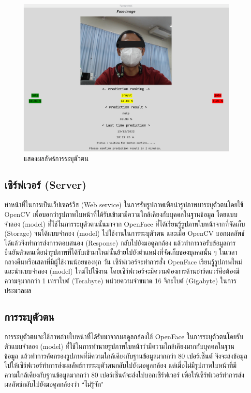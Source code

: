 \begin{figure}[!ht]
  \begin{center}
    \includegraphics[scale=.45]{pic/result_page_blind.png}
  \caption[แสดงผลลัพธ์การระบุตัวตน]{แสดงผลลัพธ์การระบุตัวตน}
  \end{center}
  \label{fig:predict_result}
\end{figure}


\subsection{เซิร์ฟเวอร์ (Server)}
ทำหน้าที่ในการเป็นเว็ปเซอร์วิส (Web service) ในการรับรูปภาพเพื่อนำรูปภาพมาระบุตัวตนโดยใช้ OpenCV
เพื่อบอกว่ารูปภาพใบหน้าที่ได้รับเข้ามามีความใกล้เคียงกับบุคคลในฐานข้อมูล โดยแบบจำลอง (model) ที่ใช้ในการระบุตัวตนนั้นมาจาก OpenFace ที่ได้เรียนรู้รูปภาพใบหน้าจากที่จัดเก็บ (Storage) 
จนได้แบบจำลอง (model) ไปใช้งานในการระบุตัวตน และเมื่อ OpenCV บอกผลลัพธ์ได้แล้วจึงทำการส่งการตอบสนอง (Response) 
กลับไปยังมอดูลกล้อง แล้วทำการรอรับข้อมูลการยืนยันตัวตนเพื่อนำรูปภาพที่ได้รับเข้ามาใหม่นั้นย้ายไปยังตำแหน่งที่จัดเก็บของบุลคลนั้น ๆ ในเวลากลางคืนหรือเสลาที่มีผู้ใช้งานน้อยของทุก 
วัน เซิร์ฟเวอร์จะทำการสั่ง OpenFace เรียนรู้รูปภาพใหม่ และนำแบบจำลอง (model) ใหม่ไปใช้งาน โดยเซิร์ฟเวอร์จะมีความต้องการด้านฮาร์ดแวร์คือต้องมีความจุมากกว่า 1 เทราไบต์  (Terabyte) 
หน่วยความจำขนาด 16 จิกะไบต์ (Gigabyte) ในการประมวลผล

\subsection{การระบุตัวตน}
การระบุตัวตนจะใช้ภาพถ่ายใบหน้าที่ได้รับมาจากมอดูลกล้องใช้ OpenFace ในการระบุตัวตนโดยรับตัวแบบจำลอง (model) ที่ใช้ในการทำนายรูปภาพใบหน้าว่ามีความใกล้เคียงมากกับบุคคลในฐานข้อมูล
แล้วทำการคัดกรองรูปภาพที่มีความใกล้เคียงกับฐานข้อมูลมากกว่า 80 เปอร์เซ็นต์ จึงจะส่งข้อมูลไปให้เซิร์ฟเวอร์ทำการส่งผลลัพธ์การระบุตัวตนกลับไปยังมอดูลกล้อง
แต่เมื่อไม่มีรูปภาพใบหน้าที่มีความใกล้เคียงกับฐานข้อมูลมากกว่า 80 เปอร์เซ็นต์จะส่งไปบอกเซิร์ฟเวอร์ เพื่อให้เซิร์ฟเวอร์ทำการส่งผลลัพธ์กลับไปยังมอดูลกล้องว่า ``ไม่รู้จัก"

